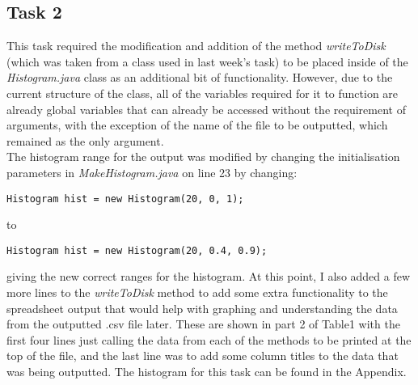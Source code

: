 \documentclass{article}
\begin{document}
\begin{multicols}{2}
\section{Task 2}
This task required the modification and addition of the method \textit{writeToDisk} (which was taken from a class used in last week's task) to be placed inside of the \textit{Histogram.java} class as an additional bit of functionality. However, due to the current structure of the class, all of the variables required for it to function are already global variables that can already be accessed without the requirement of arguments, with the exception of the name of the file to be outputted, which remained as the only argument. \\ \indent The histogram range for the output was modified by changing the initialisation parameters in \textit{MakeHistogram.java} on line 23 by changing:
\begin{lstlisting}
Histogram hist = new Histogram(20, 0, 1);  
\end{lstlisting}
to
\begin{lstlisting}
Histogram hist = new Histogram(20, 0.4, 0.9);  
\end{lstlisting}
giving the new correct ranges for the histogram. At this point, I also added a few more lines to the \textit{writeToDisk} method to add some extra functionality to the spreadsheet output that would help with graphing and understanding the data from the outputted .csv file later. These are shown in part 2 of Table1
with the first four lines just calling the data from each of the methods to be printed at the top of the file, and the last line was to add some column titles to the data that was being outputted. The histogram for this task can be found in the Appendix.


\end{multicols}
\end{document}
